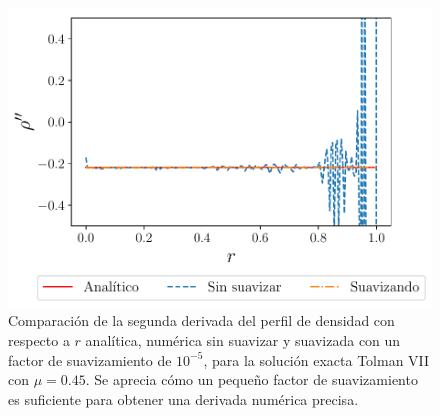 \begin{figure}[H]
    \centering
    \includegraphics[width=0.7\linewidth]{figures/rhoppTolmanVIImu45.pdf}
    \caption{Comparación de la segunda derivada del perfil de densidad con respecto a $r$ analítica, numérica sin suavizar y suavizada con un factor de suavizamiento de $10^{-5}$, para la solución exacta Tolman VII con $\mu=0.45$. Se aprecia cómo un pequeño factor de suavizamiento es suficiente para obtener una derivada numérica precisa. }
    \label{numericald}
\end{figure}